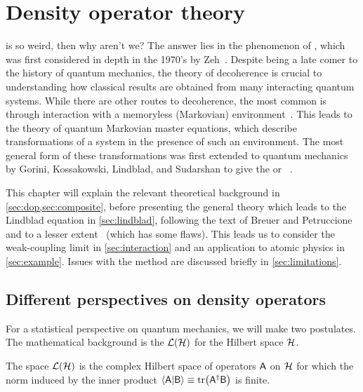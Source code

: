 \documentclass[../thesis.tex]{subfiles}
\begin{document}
\chapter{Density operator theory}

 is so weird, then why aren't we? The answer lies in the
phenomenon of , which was first considered in depth in the
1970's by Zeh~\cite{zeh}. Despite being a late comer to the history of quantum
mechanics, the theory of decoherence is crucial to understanding how classical
results are obtained from many interacting quantum systems. While there are
other routes to decoherence, the most common is through interaction with a
memoryless (Markovian) environment~\cite{decoherence}. This leads to the theory
of quantum Markovian master equations, which describe transformations of a
system in the presence of such an environment. The most general form of these
transformations was first extended to quantum mechanics by Gorini, Kossakowski,
Lindblad, and Sudarshan to give the \textsc{} or ~\cite{gks,lindblad}.

This chapter will explain the relevant theoretical background in
\cref{sec:dop,sec:composite}, before presenting the general theory which leads
to the Lindblad equation in \cref{sec:lindblad}, following the text of Breuer
and Petruccione~\cite{opensys} and to a lesser extent~\cite{intro} (which has
some flaws). This leads us to consider the weak-coupling limit in
\cref{sec:interaction} and an application to atomic physics in
\cref{sec:example}. Issues with the method are discussed briefly in
\cref{sec:limitations}.

\section{Different perspectives on density operators\label{sec:dop}}

For a statistical perspective on quantum mechanics, we will make two postulates.
The mathematical background is the  $\mathcal{L}(\mathcal{H})$ for the
Hilbert space $\mathcal{H}$.
\begin{defn}
  The space $\mathcal{L}(\mathcal{H})$ is the complex Hilbert space of operators $\mathsf{A}$
  on $\mathcal{H}$ for which the norm induced by the inner product
  $\ip{\opr{A}}{\opr{B}} \defeq \tr(\opr{A}^\dag \opr{B})$ is finite.
\end{defn}
\end{document}
